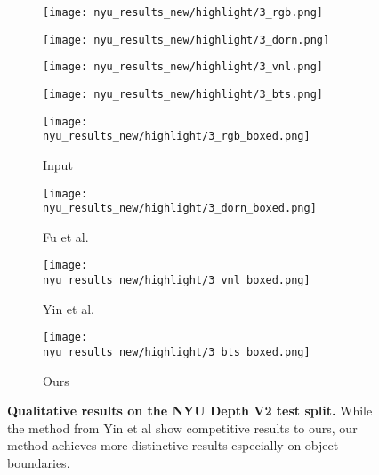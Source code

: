 \documentclass[10pt,twocolumn,letterpaper]{article}
\begin{document}
\begin{figure*}
	\begin{subfigure}{.18\linewidth}
		\centering
		\texttt{[image: nyu\_results\_new/highlight/3\_rgb.png]}
	\end{subfigure}
	\hspace{1em}
	\begin{subfigure}{.18\linewidth}
		\centering
		\texttt{[image: nyu\_results\_new/highlight/3\_dorn.png]}
	\end{subfigure}
	\hspace{1em}
	\begin{subfigure}{.18\linewidth}
		\centering
		\texttt{[image: nyu\_results\_new/highlight/3\_vnl.png]}
	\end{subfigure}
	\hspace{1em}
	\begin{subfigure}{.18\linewidth}
		\centering
		\texttt{[image: nyu\_results\_new/highlight/3\_bts.png]}
	\end{subfigure}
	
	\begin{subfigure}{.18\linewidth}
		\centering
		\texttt{[image: nyu\_results\_new/highlight/3\_rgb\_boxed.png]}
		\caption{Input}
	\end{subfigure}
	\hspace{1em}
	\begin{subfigure}{.18\linewidth}
		\centering
		\texttt{[image: nyu\_results\_new/highlight/3\_dorn\_boxed.png]}
		\caption{Fu et al. \cite{fu2018deep}}
	\end{subfigure}
	\hspace{1em}
	\begin{subfigure}{.18\linewidth}
		\centering
		\texttt{[image: nyu\_results\_new/highlight/3\_vnl\_boxed.png]}
		\caption{Yin et al. \cite{yin2019enforcing}}
	\end{subfigure}
	\hspace{1em}
	\begin{subfigure}{.18\linewidth}
		\centering
		\texttt{[image: nyu\_results\_new/highlight/3\_bts\_boxed.png]}
		\caption{Ours}
	\end{subfigure}
	\caption{\textbf{Qualitative results on the NYU Depth V2 test split.} While the method from Yin et al \cite{yin2019enforcing} show competitive results to ours, our method achieves more distinctive results especially on object boundaries. }
	\label{fg:nyu_qualitative_result}
\end{figure*}
\end{document}
